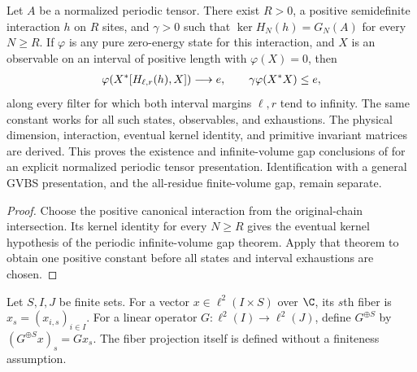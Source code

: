 \begin{lemma}
    \label{thm:periodic_positive_parent_infinite_gap}
    \leanok
    Let $A$ be a normalized periodic tensor. There exist $R>0$, a
    positive semidefinite interaction $h$ on $R$ sites, and $\gamma>0$
    such that $\ker H_N(h)=G_N(A)$ for every $N\ge R$.
    If $\varphi$ is any pure zero-energy state for this interaction,
    and $X$ is an observable on an interval of positive length with
    $\varphi(X)=0$, then
    \begin{align}
        \varphi(X^*[H_{\ell,r}(h),X])\longrightarrow e,
        \qquad \gamma\varphi(X^*X)\le e,
        \notag
    \end{align}
    along every filter for which both interval margins $\ell,r$
    tend to infinity. The same constant works for all such states,
    observables, and exhaustions. The physical dimension, interaction,
    eventual kernel identity, and primitive invariant matrices are derived.
    This proves the existence and infinite-volume gap conclusions of
    \cite[Theorems 1.1--1.2]{Nachtergaele1996Spectral} for an explicit
    normalized periodic tensor presentation. Identification with a general
    GVBS presentation, and the all-residue finite-volume gap, remain separate.
\end{lemma}
\begin{proof}\leanok
    Choose the positive canonical interaction from the original-chain
    intersection. Its kernel identity for every $N\ge R$ gives the
    eventual kernel hypothesis of the periodic infinite-volume gap theorem.
    Apply that theorem to obtain one positive constant before all states
    and interval exhaustions are chosen.
\end{proof}

\begin{definition}
    \label{def:euclidean_fiberwise_operator}
    \leanok
    Let $S,I,J$ be finite sets. For a vector $x\in\ell^2(I\times S)$ over
    $\C$, its $s$th fiber is $x_s=(x_{i,s})_{i\in I}$. For a linear operator
    $G:\ell^2(I)\to\ell^2(J)$, define $G^{\oplus S}$ by
    $(G^{\oplus S}x)_s=Gx_s$.
    The fiber projection itself is defined without a finiteness assumption.
\end{definition}

